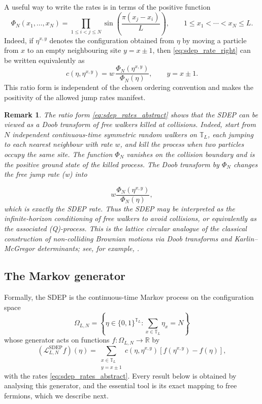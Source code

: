 \documentclass[11pt]{article}
\numberwithin{equation}{section}
\newtheorem{remark}[theorem]{Remark}
\newcommand{\1}{\mathbf 1}
\begin{document}
A useful way to write the rates is in terms of the positive function
\begin{equation}
    \Phi_N(x_1,\ldots,x_N)
    =
    \prod_{1\leq i<j\leq N}
    \sin\left(\frac{\pi(x_j-x_i)}{L}\right),
    \qquad
    1\leq x_1<\cdots<x_N\leq L .
    \label{eq:Phi_def}
\end{equation}
Indeed, if \(\eta^{x,y}\) denotes the configuration obtained from \(\eta\) by
moving a particle from \(x\) to an empty neighbouring site \(y=x\pm1\), then
\eqref{eq:sdep_rate_right} can be written equivalently as
\begin{equation}
    c(\eta,\eta^{x,y})
    =
    w\,
    \frac{\Phi_N(\eta^{x,y})}{\Phi_N(\eta)},
    \qquad y=x\pm1.
    \label{eq:sdep_rates_abstract}
\end{equation}
This ratio form is independent of the chosen ordering convention and makes the
positivity of the allowed jump rates manifest.
\begin{remark}
\label{rem:noncolliding_walkers}
The ratio form \eqref{eq:sdep_rates_abstract} shows that the SDEP can be viewed
as a Doob transform of free walkers killed at collisions.  Indeed, start from
$N$ independent continuous-time symmetric random walkers on $\mathbb T_L$,
each jumping to each nearest neighbour with rate $w$, and kill the process
when two particles occupy the same site.  The function $\Phi_N$ vanishes on
the collision boundary and is the positive ground state of the killed process.
The Doob transform by $\Phi_N$ changes the free jump rate (w) into

$$w\frac{\Phi_N(\eta^{x,y})}{\Phi_N(\eta)},$$
which is exactly the SDEP rate. Thus the SDEP may be interpreted as the infinite-horizon conditioning of free
walkers to avoid collisions, or equivalently as the associated (Q)-process.
This is the lattice circular analogue of the classical construction of
non-colliding Brownian motions via Doob transforms and
Karlin--McGregor determinants; see, for example,
\cite{Doob1957,KarlinMcGregor1959,KatoriTanemura2007}.
\end{remark}

\subsection{The Markov generator}
\label{subsec:generator}

Formally, the SDEP is the continuous-time Markov process on the configuration
space
\[
    \Omega_{L,N}
    =
    \left\{
    \eta\in\{0,1\}^{\mathbb T_L}:
    \sum_{x\in\mathbb T_L}\eta_x=N
    \right\}
\]
whose generator acts on functions \(f:\Omega_{L,N}\to\mathbb R\) by
\begin{equation}
    (\mathcal L_{L,N}^{\mathrm{SDEP}}f)(\eta)
    =
    \sum_{\substack{x\in\mathbb T_L\\ y=x\pm1}}
    c(\eta,\eta^{x,y})
    \left[
    f(\eta^{x,y})-f(\eta)
    \right],
    \label{eq:sdep_generator}
\end{equation}
with the rates \eqref{eq:sdep_rates_abstract}.  Every result below is obtained by
analysing this generator, and the essential tool is its exact mapping to free
fermions, which we describe next.
\end{document}

